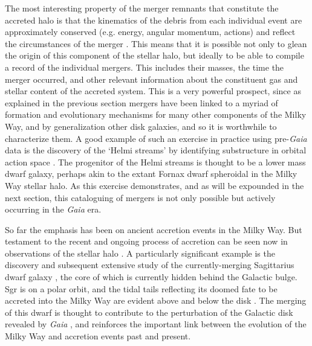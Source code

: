 The most interesting property of the merger remnants that constitute the accreted halo is that the kinematics of the debris from each individual event are approximately conserved (e.g. energy, angular momentum, actions) and reflect the circumstances of the merger \parencite{helmi00,johnston08}. This means that it is possible not only to glean the origin of this component of the stellar halo, but ideally to be able to compile a record of the individual mergers. This includes their masses, the time the merger occurred, and other relevant information about the constituent gas and stellar content of the accreted system. This is a very powerful prospect, since as explained in the previous section mergers have been linked to a myriad of formation and evolutionary mechanisms for many other components of the Milky Way, and by generalization other disk galaxies, and so it is worthwhile to characterize them. A good example of such an exercise in practice using pre-\textit{Gaia} data is the discovery of the `Helmi streams' by identifying substructure in orbital action space \parencite{helmi99}. The progenitor of the Helmi streams is thought to be a lower mass dwarf galaxy, perhaps akin to the extant Fornax dwarf spheroidal in the Milky Way stellar halo. As this exercise demonstrates, and as will be expounded in the next section, this cataloguing of mergers is not only possible but actively occurring in the \textit{Gaia} era.

So far the emphasis has been on ancient accretion events in the Milky Way. But testament to the recent and ongoing process of accretion can be seen now in observations of the stellar halo \parencite[e.g. the `field of streams';][]{belokurov06}. A particularly significant example is the discovery and subsequent extensive study of the currently-merging Sagittarius dwarf galaxy \parencite[Sgr;][]{ibata94}, the core of which is currently hidden behind the Galactic bulge. Sgr is on a polar orbit, and the tidal tails reflecting its doomed fate to be accreted into the Milky Way are evident above and below the disk \parencite{majewski03,belokurov06}. The merging of this dwarf is thought to contribute to the perturbation of the Galactic disk revealed by \textit{Gaia} \parencite[see the previous section and][]{antoja18,laporte19}, and reinforces the important link between the evolution of the Milky Way and accretion events past and present.

